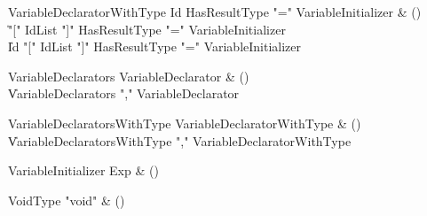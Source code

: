 \begin{bbgrammar}

VariableDeclaratorWithType \label{prod:VariableDeclaratorWithType}  \: Id HasResultType \xcd"=" VariableInitializer & () \\

    \| \xcd"[" IdList \xcd"]" HasResultType \xcd"=" VariableInitializer \\
    \| Id \xcd"[" IdList \xcd"]" HasResultType \xcd"=" VariableInitializer \\

\end{bbgrammar}

\begin{bbgrammar}

VariableDeclarators \label{prod:VariableDeclarators}  \: VariableDeclarator & () \\

    \| VariableDeclarators \xcd"," VariableDeclarator \\

\end{bbgrammar}

\begin{bbgrammar}

VariableDeclaratorsWithType \label{prod:VariableDeclaratorsWithType}  \: VariableDeclaratorWithType & () \\

    \| VariableDeclaratorsWithType \xcd"," VariableDeclaratorWithType \\

\end{bbgrammar}

\begin{bbgrammar}

VariableInitializer \label{prod:VariableInitializer}  \: Exp & () \\


\end{bbgrammar}

\begin{bbgrammar}

VoidType \label{prod:VoidType}  \: \xcd"void" & () \\


\end{bbgrammar}

